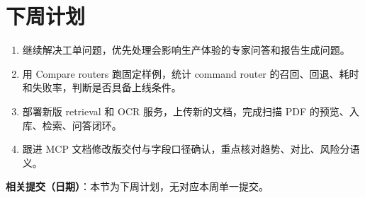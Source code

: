 \documentclass[UTF8]{ctexart}
\begin{document}
\section{下周计划}

\begin{enumerate}
\item 继续解决工单问题，优先处理会影响生产体验的专家问答和报告生成问题。

\item 用 Compare routers 跑固定样例，统计 command router 的召回、回退、耗时和失败率，判断是否具备上线条件。

\item 部署新版 retrieval 和 OCR 服务，上传新的文档，完成扫描 PDF 的预览、入库、检索、问答闭环。

\item 跟进 MCP 文档修改版交付与字段口径确认，重点核对趋势、对比、风险分语义。
\end{enumerate}

\textbf{相关提交（日期）}：本节为下周计划，无对应本周单一提交。
\end{document}
